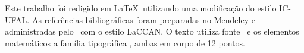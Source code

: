 \documentclass[tcc]{ic}
\begin{document}


\mylistofcontents


\inicio
\setcounter{page}{9} %








\appendix


\begin{raggedright}
%

\renewcommand{\bibsection}{
\chapter*{\vspace{-3cm}\centering \Large \textsc{Referências Bibliográficas}}
\addcontentsline{toc}{chapter}{Referências Bibliográficas}
}

\newpage\lhead{\rightmark}
\end{raggedright}



\chapter*{}
\vfill
\singlespacing
\thispagestyle{empty}
\begin{center}
Este trabalho foi redigido em {\large \LaTeX}\ utilizando uma modificação do estilo \textsf{IC-UFAL}.
As referências bibliográficas foram preparadas no \textsf{Mendeley} e administradas pelo {\large\BibTeX}\ com o estilo \textsf{LaCCAN}.
O texto utiliza fonte \NomeFonte\ e os elementos matemáticos a família tipográfica \NomeFonteMat, ambas em corpo de 12 pontos.
\end{center}
\end{document}
